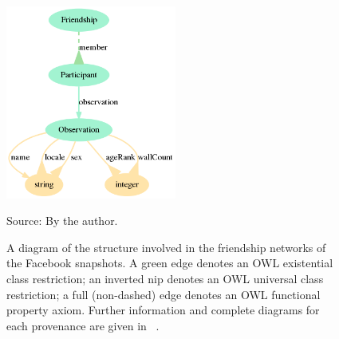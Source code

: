 \begin{figure}[!ht]
\centering
\includegraphics[width=0.5\textwidth]{ontologies/facebook-legacy-AntonioAnzoategui18022013Friendship.ttl/draw}
\caption{A diagram of the structure involved in the friendship networks
of the Facebook snapshots.
A green edge denotes an OWL existential class restriction;
an inverted nip denotes an OWL universal class restriction;
a full (non-dashed) edge denotes an OWL functional property axiom.
Further information and complete diagrams for each provenance are given in ~\cite{losd}.}\label{dia}
\begin{flushleft}\footnotesize
Source: By the author.\
\end{flushleft}
\end{figure}


